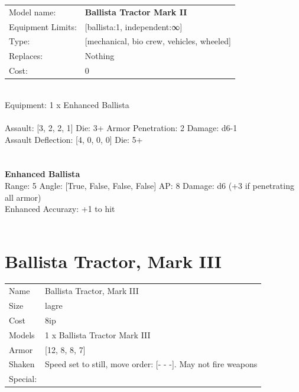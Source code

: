 \noindent
\begin{tabular}{ll}
Model name: &{\bf Ballista Tractor Mark II } \\
Equipment Limits: &[ballista:1, independent:∞] \\
Type: &[mechanical, bio crew, vehicles, wheeled] \\
Replaces: &Nothing \\
Cost: & 0\\
\end{tabular}
\ \\
Equipment: 1 x Enhanced Ballista \\
\ \\
Assault: [3, 2, 2, 1] Die: 3+ Armor Penetration: 2 Damage: d6-1 \\
Assault Deflection: [4, 0, 0, 0] Die: 5+\\
\indent  
\ \\

\ \\
{\bf Enhanced Ballista } \\



Range: 5  Angle: [True, False, False, False] AP: 8 Damage: d6 (+3 if penetrating all armor) \\
Enhanced Accurazy: +1 to hit\\ 




 
\ \\













\clearpage

\section{ Ballista Tractor, Mark III }

\begin{tabular}{ll}
  Name & Ballista Tractor, Mark III \\
  Size & lagre\\
  Cost & 8ip\\
  Models & 1 x Ballista Tractor Mark III\\
  Armor & [12, 8, 8, 7]\\
  Shaken & Speed set to still, move order: [- - -]. May not fire weapons\\
  Special: \\
\end{tabular}


